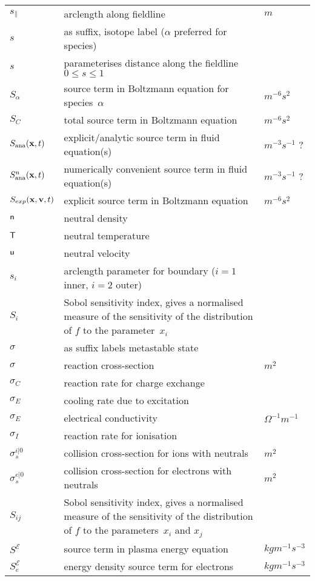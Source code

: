 \begin{longtable}{|p{3.0cm}|p{10.0cm}|p{3.0cm}|}
$s_{\|}$ & arclength along fieldline  & $m$ \\
$s$ & as suffix, isotope label ($\alpha$ preferred for species) & \\
$s$ & parameterises distance along the fieldline $0\leq s \leq 1$ & \\
$S_\alpha$ & source term in Boltzmann equation for species~$\alpha$  & $m^{-6} s^2$ \\
$S_C$ & total source term in Boltzmann equation  & $m^{-6} s^2$ \\
$S_\mathrm{ana}({\bf x},t)$ & explicit/analytic source term in fluid equation(s)  & $m^{-3} s^{-1}$ ? \\
$S^n_\mathrm{ana}({\bf x},t)$ & numerically convenient source term in fluid equation(s)  & $m^{-3} s^{-1}$ ? \\
$S_{exp}({\bf x}, {\bf v},t)$ & explicit source term in Boltzmann equation  & $m^{-6} s^2$ \\
${\sf n}$ & neutral density  & \\
${\sf T}$ & neutral temperature  & \\
${\sf u}$ & neutral velocity  & \\
$s_i$ & arclength parameter for boundary ($i=1$ inner, $i=2$ outer) & \\
$S_i$ & Sobol sensitivity index, gives a normalised measure of the sensitivity of the distribution of $f$ to the parameter~$x_i$  & \\
$\sigma$ & as suffix labels metastable state & \\
$\sigma$ & reaction cross-section  & $m^2$ \\
$\sigma_C$ & reaction rate for charge exchange  & \\
$\sigma_E$ & cooling rate due to excitation  & \\
$\sigma_E$ & electrical conductivity  & $\Omega^{-1} m^{-1}$ \\
$\sigma_I$ & reaction rate for ionisation  & \\
$\sigma_s^{i|0}$ & collision cross-section for ions with neutrals  & $m^2$ \\
$\sigma_s^{e|0}$ & collision cross-section for electrons with neutrals  & $m^2$ \\
$S_{ij}$ & Sobol sensitivity index, gives a normalised measure of the sensitivity of the distribution of $f$ to the parameters~$x_i$ and $x_j$  & \\
$S^\mathcal{E}$ & source term in plasma energy equation  & $kg m^{-1} s^{-3}$ \\
$S^{\mathcal{E}}_{e}$ & energy density source term for electrons  & $kg m^{-1} s^{-3}$ \\

\end{longtable}
